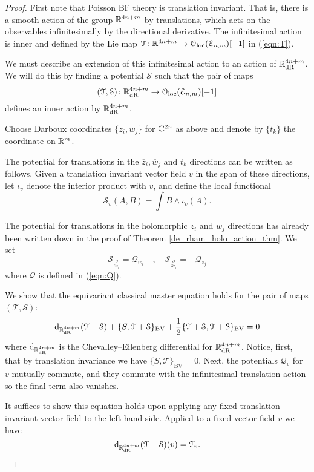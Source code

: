 \documentclass[11pt, oneside, reqno]{amsart}
\theoremstyle{definition} \newtheorem{definition}{Definition}[section]
\theoremstyle{definition}
\theoremstyle{remark}
\theoremstyle{definition} \newtheorem{remark}[definition]{Remark}
\theoremstyle{definition} \newtheorem{remarks}[definition]{Remarks}
\theoremstyle{definition} \newtheorem{question}[definition]{Question}
\theoremstyle{definition} \newtheorem*{note}{Note}
\theoremstyle{definition} \newtheorem{example}[definition]{Example}
\theoremstyle{definition} \newtheorem{examples}[definition]{Examples}
\def\oloc{\mathcal{O}_{\rm loc}}
\def\Bar{\overline}
\def\cE{\mathcal E}\def\cF{\mathcal F}\def\cG{\mathcal G}\def\cH{\mathcal H}
\def\cQ{\mathcal Q}\def\cR{\mathcal R}\def\cS{\mathcal S}\def\cT{\mathcal T}
\newcommand{\mr}[1]{\mathrm{#1}}
\newcommand{\mc}[1]{\mathcal{#1}}
\def\d{{\rm d}}
\begin{document}
\begin{proof}
First note that Poisson BF theory is translation invariant.  
That is, there is a smooth action of the group $\mathbb R^{4n+m}$ by translations, which acts on the observables infinitesimally by the directional derivative.
The infinitesimal action is inner and defined by the Lie map $\cT \colon \RR^{4n+m} \to \oloc(\cE_{n,m})[-1]$ in (\ref{eqn:T}). 

We must describe an extension of this infinitesimal action to an action of $\RR^{4n+m}_{\mr{dR}}$.
We will do this by finding a potential $\cS$ such that the pair of maps
\[
(\cT, \cS) \colon \RR^{4n+m}_{\rm dR} \to \oloc(\cE_{n,m})[-1]
\]
defines an inner action by $\mathbb R^{4n+m}_{\rm dR}$. 

Choose Darboux coordinates $\{z_i,w_j\}$ for $\mathbb C^{2n}$ as above and denote by $\{t_k\}$ the coordinate on $\mathbb R^m$. 

The potential for translations in the $\Bar{z}_i,  \Bar{w}_j$ and $t_k$ directions can be written as follows.  
Given a translation invariant vector field $v$ in the span of these directions, let $\iota_v$ denote the interior product with $v$, and define the local functional 
\[
\mc S_v (A,B) = \int B \wedge \iota_v(A).\]

The potential for translations in the holomorphic $z_i$ and $w_j$ directions has already been written down in the proof of Theorem \ref{de_rham_holo_action_thm}. 
We set
\[
\cS_{\frac{\partial}{\partial z_i}} = \cQ_{w_i} \quad , \quad \cS_{\frac{\partial}{\partial z_i}} = -\cQ_{z_j} 
\]
where $\cQ$ is defined in (\ref{eqn:Q}). 

We show that the equivariant classical master equation holds for the pair of maps $(\cT, \cS)$:
\begin{equation}
\d_{\RR^{4n+m}_{\rm dR}} (\cT + \cS) + \{S, \cT + \cS\}_{\mr{BV}} + \frac{1}{2} \{\cT + \cS, \cT + \cS\}_{\mr{BV}} = 0
\label{dR_CME}
\end{equation}
where $\d_{\RR^{4n+m}_{\rm dR}}$ is the Chevalley--Eilenberg differential for $\mathbb R^{4n+m}_{\rm dR}$. 
Notice, first, that by translation invariance we have $\{S, \cT\}_{\mr{BV}} = 0$. 
Next, the potentials $\mc Q_v$ for $v$ mutually commute, and they commute with the infinitesimal translation action so the final term also vanishes. 

It suffices to show this equation holds upon applying any fixed translation invariant vector field to the left-hand side.
Applied to a fixed vector field $v$ we have
\[
\d_{\RR^{4n+m}_{\rm dR}} (\cT + \cS) (v) = \cT_v .
\]


\end{proof}
\end{document}
